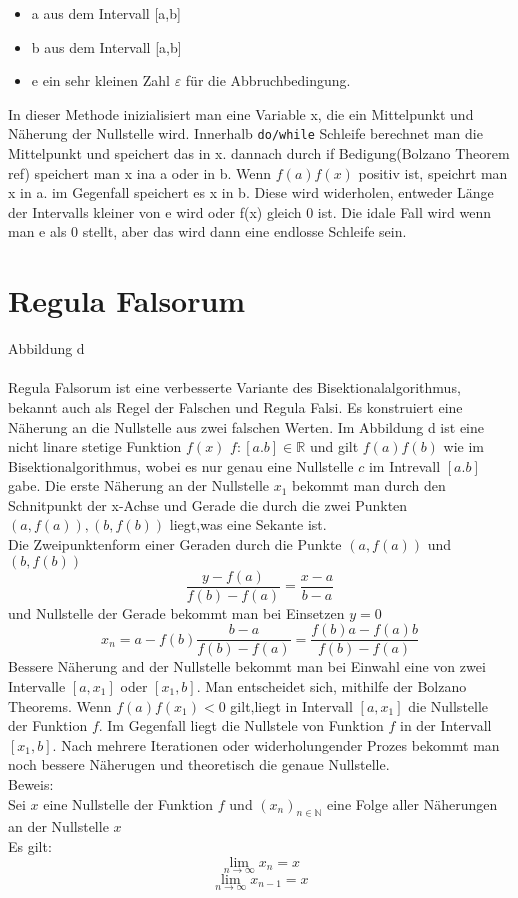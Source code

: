 \begin{itemize}
\item a aus dem Intervall [a,b]
\item b aus dem Intervall [a,b]
\item e ein sehr kleinen Zahl $\varepsilon$ für die Abbruchbedingung.
\end{itemize}
In dieser Methode inizialisiert man eine Variable x, die ein Mittelpunkt und Näherung der Nullstelle wird. Innerhalb \verb|do/while| Schleife berechnet man die Mittelpunkt und speichert das in x. dannach durch if Bedigung(Bolzano Theorem ref) speichert man x ina a oder in b. Wenn $f(a)f(x)$ positiv ist, speichrt man x in a. im Gegenfall speichert es x in b. Diese wird widerholen, entweder Länge der Intervalls kleiner von e wird oder f(x) gleich 0 ist. Die idale Fall wird wenn man e als 0 stellt, aber das wird dann eine endlosse Schleife sein.
\section{Regula Falsorum}
Abbildung d\\
\\
Regula Falsorum ist eine verbesserte Variante des Bisektionalalgorithmus, bekannt auch als Regel der Falschen und Regula Falsi. Es konstruiert eine Näherung an die Nullstelle aus zwei falschen Werten.
Im Abbildung d ist eine nicht linare stetige Funktion $f(x)$ $f: [a.b] \in \mathbb{R}$ und gilt $f(a)f(b)$ wie im Bisektionalgorithmus, wobei es nur genau eine Nullstelle $c$ im Intrevall $[a.b]$ gabe.
Die erste Näherung an der Nullstelle $x_1$ bekommt man durch den Schnitpunkt der x-Achse und Gerade die durch die zwei Punkten$(a,f(a)),(b,f(b))$ liegt,was eine Sekante ist.\\
Die Zweipunktenform einer Geraden durch die Punkte $(a,f(a))$ und $(b,f(b))$
\begin{equation}
\frac{y-f(a)}{f(b)-f(a)}= \frac{x-a}{b-a}
\end{equation}
und Nullstelle der Gerade bekommt man bei Einsetzen $y=0$
\begin{equation}
x_n = a - f(b)\frac{b - a}{f(b)-  f(a)} = \frac{f(b)a - f(a)b}{f(b) - f(a)}
\end{equation}
Bessere Näherung and der Nullstelle bekommt man bei Einwahl eine von zwei Intervalle $[a,x_1] $ oder $[x_1, b]$. Man entscheidet sich, mithilfe der Bolzano Theorems. Wenn $f(a)f(x_1) < 0$ gilt,liegt in Intervall $[a,x_1]$ die Nullstelle der Funktion $f$. Im Gegenfall liegt die Nullstele von Funktion $f$ in der Intervall $[x_1,b]$. Nach mehrere Iterationen oder widerholungender Prozes bekommt man noch bessere Näherugen und theoretisch die genaue Nullstelle.\\
Beweis:\\
Sei $x$ eine Nullstelle der Funktion $f$ und $(x_n)_{n \in \mathbb{N}}$ eine Folge aller Näherungen an der Nullstelle $x$\\
Es gilt: 
\begin{equation}
\lim_{n \to \infty}x_n = x
\end{equation}
\begin{equation} 
\lim_{n \to \infty}x_{n-1} = x
\end{equation}

